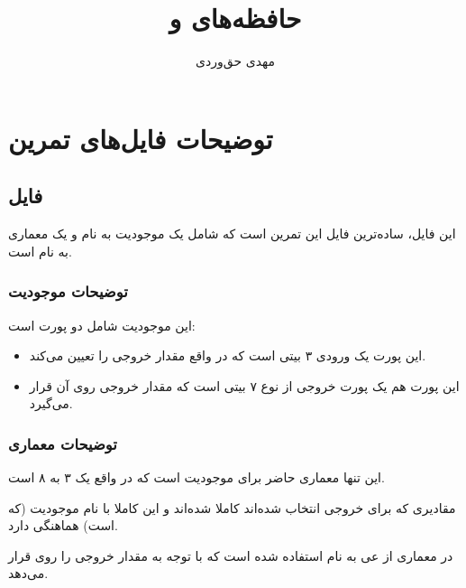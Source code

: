 \documentclass[dvipsnames, svgnames, x11names, a4paper, 11pt]{article}
\title{حافظه‌های \lr{ROM} و \lr{BRAM}}
\author{مهدی حق‌وردی}
\begin{document}
\maketitle
\tableofcontents

\section{توضیحات فایل‌های تمرین}
\subsection{فایل }
این فایل، ساده‌ترین فایل این تمرین است که شامل یک موجودیت به نام
و یک معماری به نام 
است.

\subsubsection{توضیحات موجودیت }
این موجودیت شامل دو پورت است:
\begin{itemize}
\item 
{}

این پورت یک ورودی 
۳ بیتی است که در واقع مقدار خروجی را تعیین می‌کند.

\item 
{}

این پورت هم یک پورت خروجی از نوع 
۷ بیتی است که مقدار خروجی روی آن قرار می‌گیرد.
\end{itemize}

\subsubsection{توضیحات معماری }
این تنها معماری حاضر برای موجودیت 
است که در واقع یک  ۳ به ۸ است.

مقادیری که برای خروجی انتخاب شده‌اند کاملا  شده‌اند و این کاملا با نام موجودیت (که  است) هماهنگی دارد.

در معماری از 
عی به نام 
استفاده شده است که با توجه به مقدار 
خروجی را روی 
قرار می‌دهد.
\end{document}
